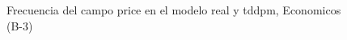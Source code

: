 \begin{figure}[H]
    \centering
    
    \caption{Frecuencia del campo  price en el modelo real y tddpm, Economicos (B-3)}
    \label{frecuency- Price-tddpm_mlp}
\end{figure}